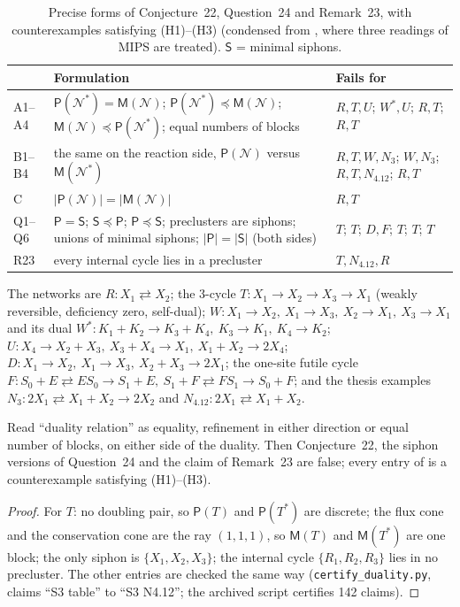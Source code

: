 \documentclass[11pt,a4paper]{report}
\newcommand{\Net}{\mathcal{N}}
\newcommand{\Nd}{\mathcal{N}^{*}}
\newcommand{\Pre}{\mathsf{P}}
\newcommand{\Mips}{\mathsf{M}}
\newcommand{\Sip}{\mathsf{S}}
\newcommand{\refi}{\preceq}
\begin{document}
\begin{table}[ht]
\centering
\caption{Precise forms of Conjecture~22, Question~24 and Remark~23, with counterexamples satisfying (H1)--(H3)
(condensed from \autocite{ArchivedReport}, where three readings of MIPS are treated). \(\Sip\) = minimal siphons.}\label{tab:formulations}
\small
\begin{tabular}{p{0.7cm}>{\raggedright\arraybackslash}p{7.6cm}>{\raggedright\arraybackslash}p{4.6cm}}
\hline
& Formulation & Fails for \\
\hline
A1--A4 & \(\Pre(\Nd)=\Mips(\Net)\); \(\Pre(\Nd)\refi\Mips(\Net)\); \(\Mips(\Net)\refi\Pre(\Nd)\); equal numbers of blocks & \(R,T,U\); \(W^*,U\); \(R,T\); \(R,T\) \\
B1--B4 & the same on the reaction side, \(\Pre(\Net)\) versus \(\Mips(\Nd)\) & \(R,T,W,N_3\); \(W,N_3\); \(R,T,N_{4.12}\); \(R,T\) \\
C & \(|\Pre(\Net)|=|\Mips(\Net)|\) & \(R,T\) \\
Q1--Q6 & \(\Pre=\Sip\); \(\Sip\refi\Pre\); \(\Pre\refi\Sip\); preclusters are siphons; unions of minimal siphons; \(|\Pre|=|\Sip|\) (both sides) & \(T\); \(T\); \(D,F\); \(T\); \(T\); \(T\) \\
R23 & every internal cycle lies in a precluster & \(T,N_{4.12},R\) \\
\hline
\end{tabular}
\end{table}

The networks are \(R\colon X_1\rightleftarrows X_2\); the 3-cycle \(T\colon X_1\to X_2\to X_3\to X_1\) (weakly
reversible, deficiency zero, self-dual); \(W\colon X_1\to X_2,\ X_1\to X_3,\ X_2\to X_1,\ X_3\to X_1\) and its dual
\(W^*\colon K_1+K_2\to K_3+K_4,\ K_3\to K_1,\ K_4\to K_2\); \(U\colon X_4\to X_2+X_3,\ X_3+X_4\to X_1,\
X_1+X_2\to2X_4\); \(D\colon X_1\to X_2,\ X_1\to X_3,\ X_2+X_3\to2X_1\); the one-site futile cycle \(F\colon
S_0+E\rightleftarrows ES_0\to S_1+E,\ S_1+F\rightleftarrows FS_1\to S_0+F\); and the thesis examples \(N_3\colon
2X_1\rightleftarrows X_1+X_2\to2X_2\) and \(N_{4.12}\colon 2X_1\rightleftarrows X_1+X_2\).

\begin{theorem}\label{thm:archive}
Read ``duality relation'' as equality, refinement in either direction or equal number of blocks, on either side of
the duality. Then Conjecture~22, the siphon versions of Question~24 and the claim of Remark~23 are false; every
entry of \zcref{tab:formulations} is a counterexample satisfying (H1)--(H3).
\end{theorem}
\begin{proof}
For \(T\): no doubling pair, so \(\Pre(T)\) and \(\Pre(T^*)\) are discrete; the flux cone and the conservation cone
are the ray \((1,1,1)\), so \(\Mips(T)\) and \(\Mips(T^*)\) are one block; the only siphon is \(\{X_1,X_2,X_3\}\); the
internal cycle \(\{R_1,R_2,R_3\}\) lies in no precluster. The other entries are checked the same way
(\texttt{certify\_duality.py}, claims ``S3 table'' to ``S3 N4.12''; the archived script certifies 142 claims).
\end{proof}
\end{document}
